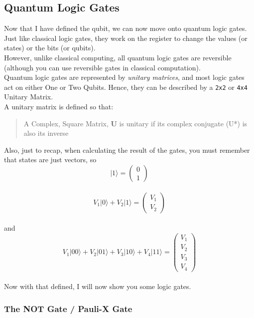 \documentclass[../main.tex]{subfiles}
\begin{document}
\subsection{Quantum Logic Gates}

Now that I have defined the qubit, we can now move onto quantum logic
gates.\\
Just like classical logic gates, they work on the register to change the
values (or states) or the bits (or qubits).\\
However, unlike classical computing, all quantum logic gates are
reversible (although you can use reversible gates in classical
computation).\\
Quantum logic gates are represented by \emph{unitary matrices}, and most
logic gates act on either One or Two Qubits. Hence, they can be
described by a \texttt{2x2} or \texttt{4x4} Unitary Matrix.\\
A unitary matrix is defined so that:

\begin{quote}
A Complex, Square Matrix, \textbf{U} is unitary if its complex conjugate
(U*) is also its inverse
\end{quote}

Also, just to recap, when calculating the result of the gates, you must
remember that states are just vectors, so\\
\[\lvert1\rangle =\left( \begin{matrix} 0\\ 1\end{matrix} \right)\]\\
\[
V_1\lvert0\rangle + V_2\lvert1\rangle =\left( \begin{matrix} V_1\\ V_2\end{matrix} \right)\]\\
and\\
\[
V_1\lvert00\rangle + V_2\lvert01\rangle + V_3\lvert10\rangle + V_4\lvert11\rangle =\left( \begin{matrix} V_1\\V_2\\V_3\\ V_4\end{matrix} \right)\]\\
Now with that defined, I will now show you some logic gates.

\subsubsection{The NOT Gate / Pauli-X Gate}
\end{document}
